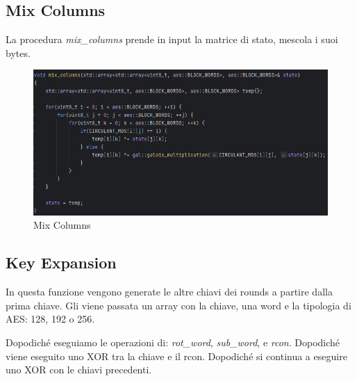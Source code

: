 \subsection{Mix Columns}

\textsf{\small La procedura \emph{mix\_columns} prende in input la matrice di stato, mescola i suoi bytes.} %


\begin{figure}[H]
	\centering
	\includegraphics[width=1\textwidth, height=1\textheight, keepaspectratio]{./images/code/cpp/encryption/mix_columns.PNG}
	\caption{Mix Columns}
	\label{fig:mix_columns}
\end{figure}


\subsection{Key Expansion}

\textsf{\small In questa funzione vengono generate le altre chiavi dei rounds a partire dalla prima chiave. Gli viene passata un array con la chiave, una word e la tipologia di AES: 128, 192 o 256.} %

\textsf{\small Dopodiché eseguiamo le operazioni di: \emph{rot\_word}, \emph{sub\_word}, e \emph{rcon}. Dopodiché viene eseguito uno XOR tra la chiave e il rcon. Dopodiché si continua a eseguire uno XOR con le chiavi precedenti.}


